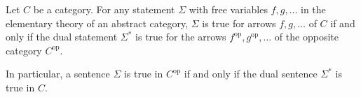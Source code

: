 Let $C$ be a category. For any statement $\Sigma$ with free variables $f, g, \ldots$ in the elementary theory of an abstract category, $\Sigma$ is true for arrows $f, g, \ldots$ of $C$ if and only if the dual statement $\Sigma^*$ is true for the arrows $f^{\text{op}}, g^{\text{op}}, \ldots$ of the opposite category $C^{\text{op}}$.

In particular, a sentence $\Sigma$ is true in $C^{\text{op}}$ if and only if the dual sentence $\Sigma^*$ is true in $C$.
